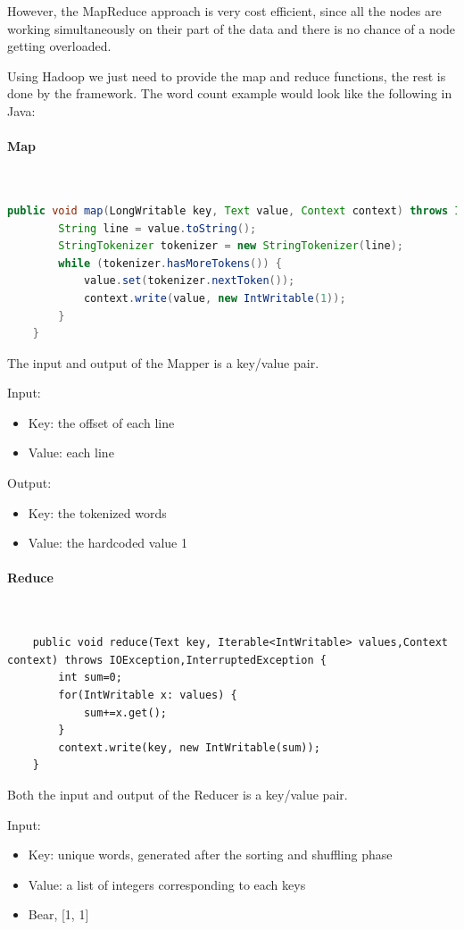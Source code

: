 However, the MapReduce approach is very cost efficient, since all the nodes are working simultaneously on their part of the data and there is no chance of a node getting overloaded.

Using Hadoop we just need to provide the map and reduce functions, the rest is done by the framework.  The word count example would look like the following in Java:
\paragraph{Map}\mbox{}\\
\begin{lstlisting}[language=Java]
	public void map(LongWritable key, Text value, Context context) throws IOException,InterruptedException {
		String line = value.toString();
		StringTokenizer tokenizer = new StringTokenizer(line);
		while (tokenizer.hasMoreTokens()) {
			value.set(tokenizer.nextToken());
			context.write(value, new IntWritable(1));
		}
	}
\end{lstlisting}
The input and output of the Mapper is a key/value pair. 

\noindent Input:
\begin{itemize}
	\item Key: the offset of each line
	\item Value: each line
\end{itemize}

\noindent Output:
\begin{itemize}
	\item Key: the tokenized words
	\item Value: the hardcoded value 1
\end{itemize}

\paragraph{Reduce}\mbox{}\\
\begin{lstlisting}
	public void reduce(Text key, Iterable<IntWritable> values,Context context) throws IOException,InterruptedException {
		int sum=0;
		for(IntWritable x: values) {
			sum+=x.get();
		}
		context.write(key, new IntWritable(sum));
	}
\end{lstlisting}
Both the input and output of the Reducer is a key/value pair. 

\noindent Input:
\begin{itemize}
	\item Key: unique words, generated after the sorting and shuffling phase
	\item Value: a list of integers corresponding to each keys
	\item \eg Bear, [1, 1]
\end{itemize}

